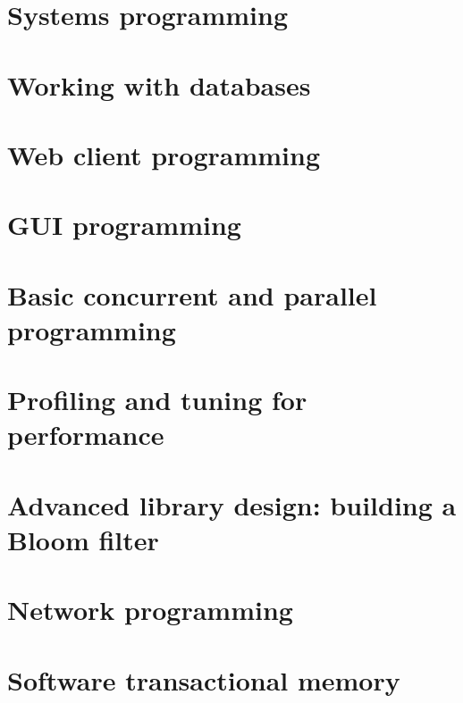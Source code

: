 \documentclass[UTF8]{ctexart}
\begin{document}
\section{Systems programming}

\newpage

\section{Working with databases}

\newpage

\section{Web client programming}

\newpage

\section{GUI programming}

\newpage

\section{Basic concurrent and parallel programming}

\newpage

\section{Profiling and tuning for performance}

\newpage

\section{Advanced library design: building a Bloom filter}

\newpage

\section{Network programming}

\newpage

\section{Software transactional memory}

\newpage
\end{document}
